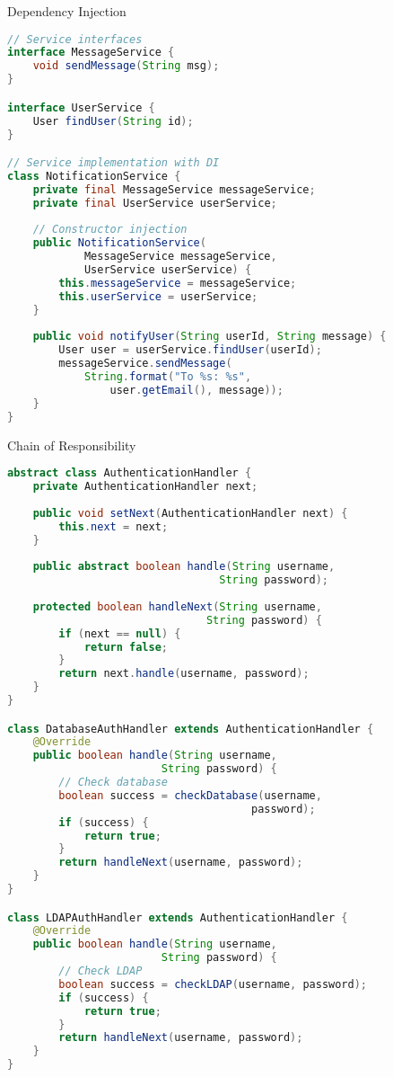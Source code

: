 \begin{example}{Dependency Injection}
\begin{lstlisting}[language=Java]
// Service interfaces
interface MessageService {
    void sendMessage(String msg);
}

interface UserService {
    User findUser(String id);
}

// Service implementation with DI
class NotificationService {
    private final MessageService messageService;
    private final UserService userService;
    
    // Constructor injection
    public NotificationService(
            MessageService messageService,
            UserService userService) {
        this.messageService = messageService;
        this.userService = userService;
    }
    
    public void notifyUser(String userId, String message) {
        User user = userService.findUser(userId);
        messageService.sendMessage(
            String.format("To %s: %s", 
                user.getEmail(), message));
    }
}
\end{lstlisting}
\end{example}

\begin{example}{Chain of Responsibility}
\begin{lstlisting}[language=Java]
abstract class AuthenticationHandler {
    private AuthenticationHandler next;
    
    public void setNext(AuthenticationHandler next) {
        this.next = next;
    }
    
    public abstract boolean handle(String username, 
                                 String password);
    
    protected boolean handleNext(String username, 
                               String password) {
        if (next == null) {
            return false;
        }
        return next.handle(username, password);
    }
}

class DatabaseAuthHandler extends AuthenticationHandler {
    @Override
    public boolean handle(String username, 
                        String password) {
        // Check database
        boolean success = checkDatabase(username, 
                                      password);
        if (success) {
            return true;
        }
        return handleNext(username, password);
    }
}

class LDAPAuthHandler extends AuthenticationHandler {
    @Override
    public boolean handle(String username, 
                        String password) {
        // Check LDAP
        boolean success = checkLDAP(username, password);
        if (success) {
            return true;
        }
        return handleNext(username, password);
    }
}
\end{lstlisting}
\end{example}

